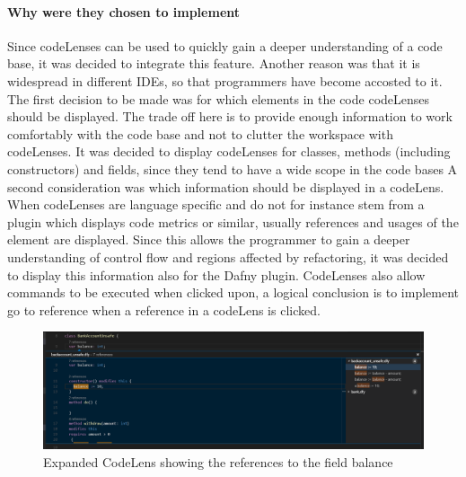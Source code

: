\paragraph{Why were they chosen to implement}
Since codeLenses can be used to quickly gain a deeper understanding of a code base, it was decided to integrate this feature. Another reason was that it is widespread in different IDEs, so that programmers have become accosted to it. \newline
The first decision to be made was for which elements in the code codeLenses should be displayed. The trade off here is to  provide enough information to work comfortably with the code base and not to clutter the workspace with codeLenses. It was decided to display codeLenses for classes, methods (including constructors) and fields, since they tend to have a wide scope in the code bases \newline
A second consideration was which information should be displayed in a codeLens. When codeLenses are language specific and do not for instance stem from a plugin which displays code metrics or similar, usually references and usages of the element are displayed. Since this allows the programmer to gain a deeper understanding of control flow and regions affected by refactoring, it was decided to display this information also for the Dafny plugin. CodeLenses also allow commands to be executed when clicked upon, a logical conclusion is to implement go to reference when a reference in a codeLens is clicked.\newline
\begin{figure}[H]
	\centering
	\includegraphics[width=1\textwidth]{img/codelensesExpanded}
	\caption{Expanded CodeLens showing the references to the field balance}
	\label{fig:agcodelensesexpanded}
\end{figure}

